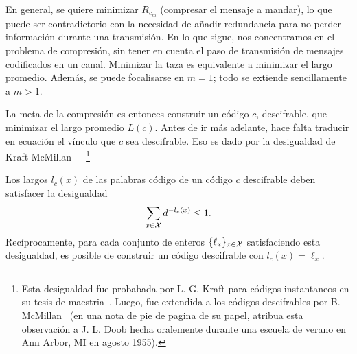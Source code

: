 En general,  se quiere minimizar $R_{c_m}$  (compresar el mensaje  a mandar), lo
que puede  ser contradictorio con la  necesidad de a\~nadir  redundancia para no
perder  informaci\'on   durante  una  transmisi\'on.   En  lo   que  sigue,  nos
concentramos en  el problema  de compresi\'on,  sin tener en  cuenta el  paso de
transmisi\'on  de  mensajes codificados  en  un  canal.   Minimizar la  taza  es
equivalente a minimizar el largo  promedio. Adem\'as, se puede focalisarse en $m
= 1$; todo se extiende sencillamente a $m > 1$.

La meta de  la compresi\'on es entonces construir  un c\'odigo $c$, descifrable,
que minimizar el largo promedio $L(c)$.
%
%
Antes de ir  m\'as adelante, hace falta traducir en  ecuaci\'on el v\'inculo que
$c$    sea    descifrable.    Eso    es    dado    por    la   desigualdad    de
Kraft-McMillan~~\cite{Kra49,   McM56,   Kar61}~\footnote{Esta  desigualdad   fue
  probabada  por  L.  G.   Kraft  para c\'odigos  instantaneos  en  su tesis  de
  maestria~\cite{Kra49}.  Luego, fue extendida  a los c\'odigos descifrables por
  B.  McMillan~\cite{McM56} (en  una nota de pie de pagina  de su papel, atribua
  esta  observaci\'on a J.   L.  Doob  hecha oralemente  durante una  escuela de
  verano en Ann Arbor, MI en agosto 1955).}
%
\begin{teorema}
\label{Teo:SZ:KraftMcMillan}
%
  Los largos  $l_c(x)$ de las palabras  c\'odigo de un  c\'odigo $c$ descifrable
  deben satisfacer la desigualdad
  \[
  \sum_{x \in \mathcal{X}} d^{-l_c(x)} \le 1.
  \]
  Rec\'iprocamente,  para cada  conjunto de  enteros $\{  \ell_x \}_{x  \in \mathcal{X}}$
  satisfaciendo  esta   desigualdad,  es   posible  de  construir   un  c\'odigo
  descifrable con $l_c(x) = \ell_x$.
\end{teorema}
%
